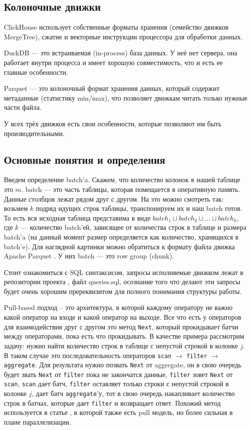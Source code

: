 \documentclass[a4paper,12pt]{extarticle}
\begin{document}
\subsection{Колоночные движки}

ClickHouse \cite{clickhouse} использует собственные форматы хранения (семейство
движков MergeTree), сжатие и векторные инструкции процессора для обработки данных.

DuckDB \cite{duckdb} — это встраиваемая (in-process) база данных. У неё нет сервера,
она работает внутри процесса и имеет хорошую совместимость, что и есть ее главные особенности.

Parquet \cite{parquet} — это колоночный формат хранения данных, который содержит
метаданные (статистику min/max), что позволяет движкам читать только нужные части
файла.

У всех трёх движков есть свои особенности, которые позволяют им быть
производительными.

\subsection{Основные понятия и определения}
Введем определение batch’a. Скажем, что количество колонок в нашей таблице это $m$.
batch — это часть таблицы, которая помещается в оперативную память.
Данные столбцов лежат рядом друг с другом. На это можно смотреть так: возьмем $k$
подряд идущих строк таблицы, транспонируем их и наш batch готов. То есть вся
исходная таблица представима в виде $batch_1 \sqcup batch_2 \sqcup \dots \sqcup batch_k$,
где $k$ — количество batch’ей, зависящее от количества строк в таблице и размера
batch’a (на данный момент размер определяется как количество, хранящихся в batch’e).
Для наглядной картинки можно обратиться к формату файла движка
Apache Parquet \cite{parquet}. У них batch — это row group (chunk).

Стоит ознакомиться с SQL синтаксисом, запросы исполняемые движком лежат в 
репозитории проекта \cite{GitHub}, файл queries.sql, осознание того
что делают эти запросы будет очень
хорошим пререквизитом для полного понимания структуры работы.

Pull-based подход -- это архитектура, в которой каждому оператору
не важно какой оператор на входе и какой оператор на выходе. Все что есть у
операторов для взаимодействия друг с другом это метод \texttt{Next}, который прокидывает
батчи между операторами, пока есть что прокидывать. В качестве примера
рассмотрим задачу: нужно найти количество строк в таблице с непустой строкой в колонке $j$.
В таком случае это последовательность операторов \texttt{scan} $\rightarrow$ \texttt{filter} $\rightarrow$
\texttt{aggregate}.
Для результата нужно позвать \texttt{Next} от aggregate, он в свою очередь
будет звать \texttt{Next} от \texttt{filter} пока не закончатся данные, \texttt{filter} зовет
\texttt{Next} от \texttt{scan}, \texttt{scan} дает батч, \texttt{filter} оставляет только строки с непустой строкой в колонке
$j$, дает батч \texttt{aggregate}'у, тот в свою очередь накапливает количество строк
в батчах, которые дает \texttt{filter} и возвращает ответ. Похожий метод используется в статье
\cite{pull_volcano}, в которой также есть pull модель, но более сильная в плане параллелизации.
\end{document}
